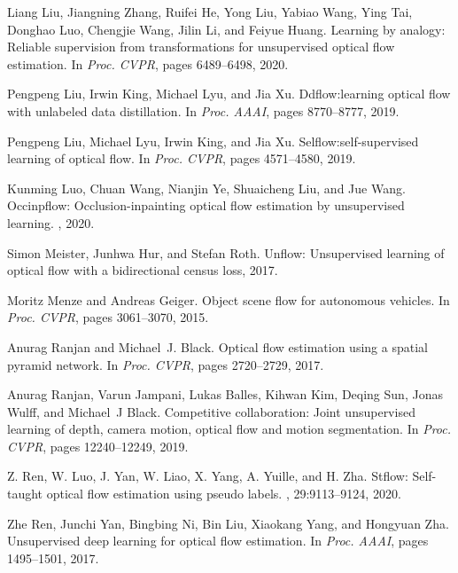 \documentclass[final]{cvpr}
\begin{document}
\begin{thebibliography}{10}
	Liang Liu, Jiangning Zhang, Ruifei He, Yong Liu, Yabiao Wang, Ying Tai, Donghao
	Luo, Chengjie Wang, Jilin Li, and Feiyue Huang.
	\newblock Learning by analogy: Reliable supervision from transformations for
	unsupervised optical flow estimation.
	\newblock In {\em {Proc. CVPR}}, pages 6489--6498, 2020.
	
	Pengpeng Liu, Irwin King, Michael Lyu, and Jia Xu.
	\newblock Ddflow:learning optical flow with unlabeled data distillation.
	\newblock In {\em {Proc. AAAI}}, pages 8770--8777, 2019.
	
	Pengpeng Liu, Michael Lyu, Irwin King, and Jia Xu.
	\newblock Selflow:self-supervised learning of optical flow.
	\newblock In {\em {Proc. CVPR}}, pages 4571--4580, 2019.
	
	Kunming Luo, Chuan Wang, Nianjin Ye, Shuaicheng Liu, and Jue Wang.
	\newblock Occinpflow: Occlusion-inpainting optical flow estimation by
	unsupervised learning.
	, 2020.
	
	Simon Meister, Junhwa Hur, and Stefan Roth.
	\newblock Unflow: Unsupervised learning of optical flow with a bidirectional
	census loss, 2017.
	
	Moritz Menze and Andreas Geiger.
	\newblock Object scene flow for autonomous vehicles.
	\newblock In {\em {Proc. CVPR}}, pages 3061--3070, 2015.
	
	Anurag Ranjan and Michael~J. Black.
	\newblock Optical flow estimation using a spatial pyramid network.
	\newblock In {\em {Proc. CVPR}}, pages 2720--2729, 2017.
	
	Anurag Ranjan, Varun Jampani, Lukas Balles, Kihwan Kim, Deqing Sun, Jonas
	Wulff, and Michael~J Black.
	\newblock Competitive collaboration: Joint unsupervised learning of depth,
	camera motion, optical flow and motion segmentation.
	\newblock In {\em {Proc. CVPR}}, pages 12240--12249, 2019.
	
	Z. {Ren}, W. {Luo}, J. {Yan}, W. {Liao}, X. {Yang}, A. {Yuille}, and H. {Zha}.
	\newblock Stflow: Self-taught optical flow estimation using pseudo labels.
	, 29:9113--9124, 2020.
	
	Zhe Ren, Junchi Yan, Bingbing Ni, Bin Liu, Xiaokang Yang, and Hongyuan Zha.
	\newblock Unsupervised deep learning for optical flow estimation.
	\newblock In {\em {Proc. AAAI}}, pages 1495--1501, 2017.
	

\end{thebibliography}
\end{document}
